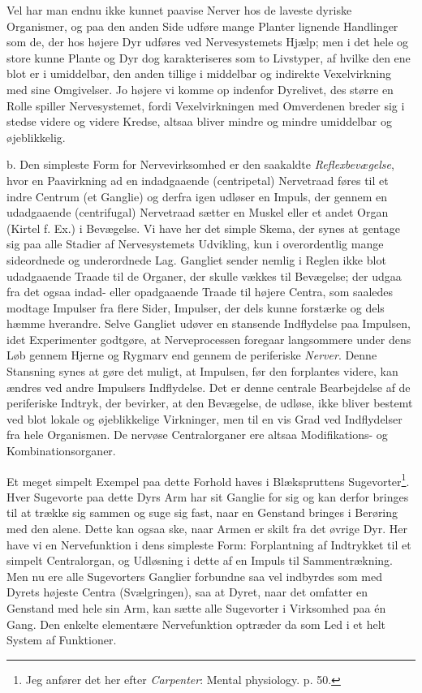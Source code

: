 \documentclass[12pt,a4paper,openany]{book}
\newcommand{\opage}[1]{\marginnote{\footnotesize\textit{[#1]}}}
\begin{document}
Vel har man endnu ikke kunnet paavise Nerver hos de laveste dyriske
Organismer, og paa den anden Side udføre mange Planter lignende
Handlinger som de, der hos højere Dyr udføres ved Nervesystemets Hjælp;
men i det hele og store kunne Plante og Dyr dog karakteriseres som to
Livstyper, af hvilke den ene blot er i umiddelbar, den anden tillige i
middelbar og indirekte Vexelvirkning med sine Omgivelser. Jo højere vi
komme op indenfor Dyrelivet, des større en Rolle spiller Nervesystemet,
fordi Vexelvirkningen med Omverdenen breder sig i stedse videre og
videre Kredse, altsaa bliver mindre og mindre umiddelbar og
øjeblikkelig.

b. Den simpleste Form for Nervevirksomhed er den saakaldte
\emph{Reflexbevægelse}, hvor en Paavirkning ad en indadgaaende
(centripetal) Nervetraad føres til et indre Centrum (et Ganglie) og
derfra igen udløser en Impuls, der gennem en udadgaaende (centrifugal)
Nervetraad sætter en Muskel eller et andet Organ (Kirtel f. Ex.) i
Bevægelse. Vi have her det simple Skema, der synes at gentage sig paa
alle Stadier af Nervesystemets Udvikling, kun i overordentlig mange
sideordnede og underordnede Lag. Gangliet sender nemlig i Reglen ikke
blot udadgaaende Traade til de Organer, der skulle vækkes til Bevægelse;
der udgaa fra det ogsaa indad- eller opadgaaende Traade til højere
Centra, som saaledes modtage Impulser fra flere Sider, Impulser, der
dels kunne forstærke og dels hæmme hverandre. Selve Gangliet udøver en
stansende Indflydelse paa
\opage{46}Impulsen, idet Experimenter godtgøre, at Nerveprocessen
foregaar langsommere under dens Løb gennem Hjerne og Rygmarv end gennem
de periferiske \emph{Nerver}. Denne Stansning synes at gøre det muligt,
at Impulsen, før den forplantes videre, kan ændres ved andre Impulsers
Indflydelse. Det er denne centrale Bearbejdelse af de periferiske
Indtryk, der bevirker, at den Bevægelse, de udløse, ikke bliver bestemt
ved blot lokale og øjeblikkelige Virkninger, men til en vis Grad ved
Indflydelser fra hele Organismen. De nervøse Centralorganer ere altsaa
Modifikations- og Kombinationsorganer.

Et meget simpelt Exempel paa dette Forhold haves i Blækspruttens
Sugevorter\footnote[1]{Jeg anfører det her efter \emph{Carpenter}:
Mental physiology. p. 50.}. Hver Sugevorte paa dette Dyrs Arm har sit
Ganglie for sig og kan derfor bringes til at trække sig sammen og suge
sig fast, naar en Genstand bringes i Berøring med den alene. Dette kan
ogsaa ske, naar Armen er skilt fra det øvrige Dyr. Her have vi en
Nervefunktion i dens simpleste Form: Forplantning af Indtrykket til et
simpelt Centralorgan, og Udløsning i dette af en Impuls til
Sammentrækning. Men nu ere alle Sugevorters Ganglier forbundne saa vel
indbyrdes som med Dyrets højeste Centra (Svælgringen), saa at Dyret,
naar det omfatter en Genstand med hele sin Arm, kan sætte alle
Sugevorter i Virksomhed paa én Gang. Den enkelte elementære
Nervefunktion optræder da som Led i et helt System af Funktioner.
\end{document}
